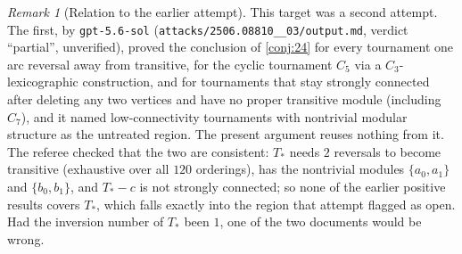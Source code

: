 \documentclass[11pt,a4paper]{article}
\theoremstyle{plain}
\theoremstyle{definition}
\theoremstyle{remark}
\newtheorem{remark}[theorem]{Remark}
\newcommand{\Tstar}{T_{\ast}}
\begin{document}
\begin{remark}[Relation to the earlier attempt]\label{rem:prior}
This target was a second attempt. The first, by \texttt{gpt-5.6-sol} (\texttt{attacks/2506.08810\_\_03/output.md}, verdict ``partial'', unverified), proved the conclusion of \cref{conj:24} for every tournament one arc reversal away from transitive, for the cyclic tournament $C_5$ via a $C_3$-lexicographic construction, and for tournaments that stay strongly connected after deleting any two vertices and have no proper transitive module (including $C_7$), and it named low-connectivity tournaments with nontrivial modular structure as the untreated region. The present argument reuses nothing from it. The referee checked that the two are consistent: $\Tstar$ needs $2$ reversals to become transitive (exhaustive over all $120$ orderings), has the nontrivial modules $\{a_0,a_1\}$ and $\{b_0,b_1\}$, and $\Tstar-c$ is not strongly connected; so none of the earlier positive results covers $\Tstar$, which falls exactly into the region that attempt flagged as open. Had the inversion number of $\Tstar$ been $1$, one of the two documents would be wrong.
\end{remark}
\end{document}
